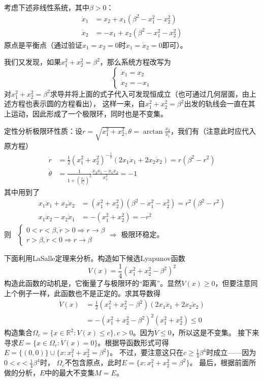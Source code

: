 \begin{example}[收敛至极限环]
	考虑下述非线性系统，其中$\beta>0$：\begin{align*}
		\dot{x}_1&=x_2+x_1(\beta^2-x_1^2-x_2^2)\\
		\dot{x}_2&=-x_1+x_2(\beta^2-x_1^2-x_2^2)
	\end{align*}
	原点是平衡点（通过验证$x_1=x_2=0$时$\dot{x}_1=\dot{x}_2=0$即可）。

	我们又发现，如果$x_1^2+x_2^2=\beta^2$，那么系统方程改写为\[\left\{\begin{array}{l}
    \dot{x}_1 = x_2\\
    \dot{x}_2 = - x_1
  \end{array}\right.\]
  对$x_1^2+x_2^2=\beta^2$求导并将上面的式子代入可发现恒成立（也可通过几何层面，由上述方程也表示圆的方程看出），
  这样一来，自$x_1^2+x_2^2=\beta^2$出发的轨线会一直在其上运动，因此形成了一个极限环，同时也是不变集。

  \begin{note}
    定性分析极限环性质：设$r = \sqrt{x^2_1 + x^2_2}, \theta = \arctan \frac{x_2}{x_1}$，我们有（注意此时应代入原方程）
  \begin{align*}
    \dot{r}& = \frac{1}{2}(x_{1}^{2}+x_{2}^{2})^{-\frac{1}{2}}(2x_{1}\dot{x}_{1}+2x_{2}\dot{x}_{2})= r (\beta^2 - r^2)\\
    \dot{\theta} & =\frac{1}{1+(\frac{x_{2}}{x_{1}})^{2}}\frac{\dot{x}_{2}x_{1}-\dot{x}_{1}x_{2}}{x_{1}^{2}}= - 1
  \end{align*}
  其中用到了
  \begin{align*}
    x_1\dot{x}_1+x_2\dot{x}_2& = (x_1^2+x_2^2)(\beta^2-x_1^2-x_2^2)= r^2 (\beta^2 - r^2)\\
    x_1\dot{x}_2-x_2\dot{x}_1 & = -(x_1^2+x_2^2)=- r^2
  \end{align*}
  则 \ $\left\{\begin{array}{l}
    0 < r < \beta, \dot{r} > 0 \Rightarrow r \rightarrow \beta\\
    r > \beta, \dot{r} < 0 \Rightarrow r \rightarrow \beta
  \end{array}\right. \Rightarrow$ 极限环稳定。
\end{note}

  下面利用LaSalle定理来分析。构造如下候选Lyapunov函数\[ V (x) = \frac{1}{4} (x^2_1 + x^2_2 - \beta^2)^2 \]
  构造此函数的动机是，它衡量了与极限环的“距离”。显然$V (x) \geq 0$，但要注意同上个例子一样，此函数也不是正定的。求其导数得
  \begin{align*}
    \dot{V} (x) & =  \frac{1}{2} (x^2_1 + x^2_2 - \beta^2) (2 x_1 \dot{x}_1 +
    2 x_2 \dot{x}_2)\\
    & =  - (x^2_1 + x^2_2 - \beta^2)^2 (x^2_1 + x^2_2)\leq 0
  \end{align*}
  构造集合$\Omega_c =
  \{ x \in \mathbb{R}^2 : V (x) \leq c \},c > 0$。因为$\dot{V} \leq 0$，所以这是不变集。
  接下来寻求$E = \{ x \in \Omega_c : \dot{V} (x) = 0 \}$。根据导函数形式可得$E = \{
  (0, 0) \} \cup \{ x : x^2_1 + x^2_2 = \beta^2 \}$。
  不过，要注意这只在$c \ge \frac{1}{4} \beta^4$时成立——因为$0 < c < \frac{1}{4} \beta^4$时，
  $\Omega_c $不包含原点，此时$E=\{ x : x^2_1 + x^2_2 = \beta^2 \}$。
  最后，根据前面所做的分析，$E$中的最大不变集$M = E$。
  

\end{example}
